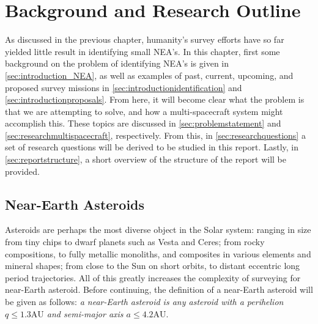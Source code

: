 \chapter{Background and Research Outline}
As discussed in the previous chapter, humanity's survey efforts have so far yielded little result in identifying small NEA's. In this chapter, first some background on the problem of identifying NEA's is given in \autoref{sec:introduction_NEA}, as well as examples of past, current, upcoming, and proposed survey missions in \autoref{sec:introductionidentification} and \autoref{sec:introductionproposals}. From here, it will become clear what the problem is that we are attempting to solve, and how a multi-spacecraft system might accomplish this. These topics are discussed in \autoref{sec:problemstatement} and \autoref{sec:researchmultispacecraft}, respectively. From this, in \autoref{sec:researchquestions} a set of research questions will be derived to be studied in this report. Lastly, in \autoref{sec:reportstructure}, a short overview of the structure of the report will be provided.

\section{Near-Earth Asteroids}
\label{sec:introduction_NEA}
Asteroids are perhaps the most diverse object in the Solar system: ranging in size from tiny chips to dwarf planets such as Vesta and Ceres; from rocky compositions, to fully metallic monoliths, and composites in various elements and mineral shapes; from close to the Sun on short orbits, to distant eccentric long period trajectories. All of this greatly increases the complexity of surveying for near-Earth asteroid. Before continuing, the definition of a near-Earth asteroid will be given as follows: \textit{a near-Earth asteroid is any asteroid with a perihelion $q \leq 1.3 \mathrm{AU}$ and semi-major axis $a \leq 4.2 \mathrm{AU}$}. \\

